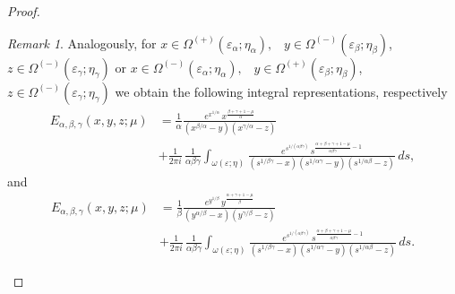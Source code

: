 \documentclass[12pt, reqno]{amsart}
\theoremstyle{definition}
\theoremstyle{remark}
\newtheorem{remark}[theorem]{Remark}
\numberwithin{equation}{section}
\begin{document}
\begin{proof}
\begin{remark} Analogously, for  $x\in\Omega^{(+)}(\varepsilon_{\alpha};\eta_\alpha),$
\,
$y\in\Omega^{(-)}(\varepsilon_{\beta};\eta_\beta)$,\, $z\in\Omega^{(-)}(\varepsilon_{\gamma};\eta_\gamma)$ or $x\in\Omega^{(-)}(\varepsilon_{\alpha};\eta_\alpha),$
\,
$y\in\Omega^{(+)}(\varepsilon_{\beta};\eta_\beta)$,\, $z\in\Omega^{(-)}(\varepsilon_{\gamma};\eta_\gamma)$
we obtain the following integral representations, respectively 
$$\begin{aligned}
E_{\alpha,\beta,\gamma}(x,y,z;\mu)
&=\frac{1}{\alpha}\frac{
e^{x^{1/\alpha}}
\,x^{\frac{\beta+\gamma+1-\mu}{\alpha}}}
{(x^{\beta/\alpha}-y)(x^{\gamma/\alpha}-z)}\\
&+
\frac{1}{2\pi i}\,
\frac{1}{\alpha\beta\gamma}
\int_{\omega(\varepsilon;\eta)}
\frac{
e^{s^{1/(\alpha\beta\gamma)}}
\,s^{\frac{\alpha+\beta+\gamma+1-\mu}{\alpha\beta\gamma}-1}
}
{
(s^{1/\beta\gamma}-x)(s^{1/\alpha\gamma}-y)(s^{1/\alpha\beta}-z)
}
\,ds,\end{aligned}
$$
and 
$$\begin{aligned}
E_{\alpha,\beta,\gamma}(x,y,z;\mu)
&=\frac{1}{\beta}\frac{
e^{y^{1/\beta}}
\,y^{\frac{\alpha+\gamma+1-\mu}{\beta}}}
{(y^{\alpha/\beta}-x)(y^{\gamma/\beta}-z)}\\
&+
\frac{1}{2\pi i}\,
\frac{1}{\alpha\beta\gamma}
\int_{\omega(\varepsilon;\eta)}
\frac{
e^{s^{1/(\alpha\beta\gamma)}}
\,s^{\frac{\alpha+\beta+\gamma+1-\mu}{\alpha\beta\gamma}-1}
}
{
(s^{1/\beta\gamma}-x)(s^{1/\alpha\gamma}-y)(s^{1/\alpha\beta}-z)
}
\,ds.\end{aligned}
$$\end{remark}


\end{proof}
\end{document}
